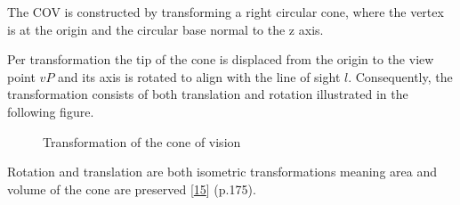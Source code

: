\documentclass[letterpaper,10pt,english]{sphinxmanual}
\begin{document}
			\sphinxAtStartPar
			The COV is constructed by transforming a right circular cone, where the vertex is at the origin and the circular base normal to the z axis.
			
			\sphinxAtStartPar
			Per transformation the tip of the cone is displaced from the origin to the view point \(vP\) and its axis is rotated to align with the line of sight \(l\).
			Consequently, the transformation consists of both translation and rotation illustrated in the following figure.
			
			\begin{figure}[htbp]
			\centering
			\capstart
			
			\noindent{}
			\caption{Transformation of the cone of vision}\label{\detokenize{NBodySimulation/Initialization:id42}}\label{\detokenize{NBodySimulation/Initialization:fig-cone}}\end{figure}
			
			\sphinxAtStartPar
			Rotation and translation are both isometric transformations meaning area and volume of the cone are preserved {[}\hyperlink{cite.NBodySimulation/Appendix:id9}{15}{]} (p.175).
			
\end{document}
